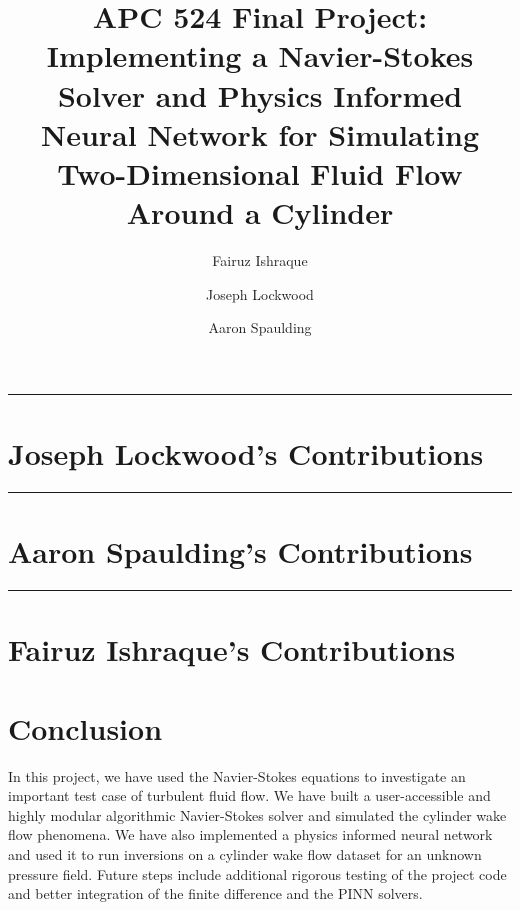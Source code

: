 \documentclass[11pt, letterpaper]{article}
\title{\titlefontlarge APC 524 Final Project:\\\titlefont Implementing a Navier-Stokes Solver and Physics Informed Neural Network for Simulating Two-Dimensional Fluid Flow Around a Cylinder}
\author[1]{Fairuz Ishraque}
\author[1]{Joseph Lockwood}
\author[2]{Aaron Spaulding}
\affil[1]{Department of Geosciences}
\affil[2]{Department of Civil and Environmental Engineering}
\date{}
\begin{document}
\maketitle
\newpage 
\tableofcontents

\newpage
\setcounter{page}{1}



\rule{\linewidth}{0.5pt}
\section{Joseph Lockwood's Contributions}


\rule{\linewidth}{0.5pt}
\section{Aaron Spaulding's Contributions}


\rule{\linewidth}{0.5pt}
\newpage
\section{Fairuz Ishraque's Contributions}


\newpage
\section{Conclusion}
In this project, we have used the Navier-Stokes equations to investigate an important test case of turbulent fluid flow. We have built a user-accessible and highly modular algorithmic Navier-Stokes solver and simulated the cylinder wake flow phenomena. We have also implemented a physics informed neural network and used it to run inversions on a cylinder wake flow dataset for an unknown pressure field. Future steps include additional rigorous testing of the project code and better integration of the finite difference and the PINN solvers.
\newpage
\printbibliography
\end{document}
